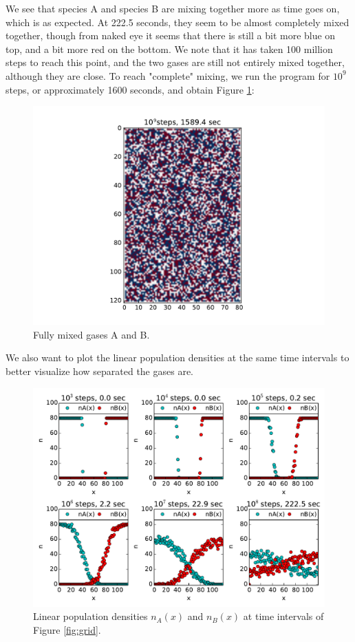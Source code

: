 \documentclass{article}
\begin{document}
\noindent We see that species A and species B are mixing together more as time goes on, which is as expected. At 222.5 seconds, they seem to be almost completely mixed together, though from naked eye it seems that there is still a bit more blue on top, and a bit more red on the bottom. We note that it has taken 100 million steps to reach this point, and the two gases are still not entirely mixed together, although they are close. To reach "complete" mixing, we run the program for $10^{9}$ steps, or approximately 1600 seconds, and obtain Figure \ref{fig:maxdens}:\par
\begin{figure}[H]
\centering
\includegraphics[width=12cm]{GP1_3_maxlimit.pdf}
\caption{Fully mixed gases A and B.}
\label{fig:maxdens}
\end{figure}
We also want to plot the linear population densities at the same time intervals to better visualize how separated the gases are.\par
\begin{figure}[H]
\centering
\includegraphics[width=12cm]{GP1_3b_2.pdf}
\caption{Linear population densities $n_{A}(x)$ and $n_{B}(x)$ at time intervals of Figure \ref{fig:grid}.}
\label{fig:dens}
\end{figure}
\end{document}
